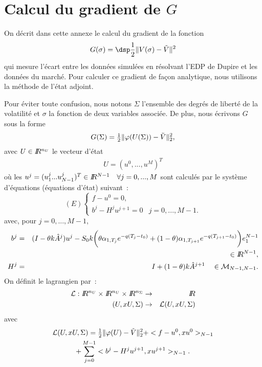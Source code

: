 \section{Calcul du gradient de $G$}
\label{ANN:GRADG}

On d\'ecrit dans cette annexe le calcul du gradient de la fonction 
$$
G(\sigma) = \dsp\frac{1}{2} \| V(\sigma) - \tilde{V} \|^2 
$$
qui mesure l'\'ecart entre les donn\'ees simul\'ees en r\'esolvant 
l'EDP de Dupire et les donn\'ees du march\'e. Pour calculer ce 
gradient de fa\c con analytique, nous utilisons la m\'ethode de 
l'\'etat adjoint.

Pour \'eviter toute confusion, nous notons $\Sigma$ l'ensemble 
des degr\'es de libert\'e de la volatilit\'e et $\sigma$ la 
fonction de deux variables associ\'ee. De plus, nous \'ecrivons 
$G$ sous la forme 
$$
G(\Sigma) = \mbox{$\frac{1}{2}$} \Arrowvert \varphi(U(\Sigma)) - 
\tilde{V} \Arrowvert_2^2,
$$
avec $U \in I\!\! R^{n_U}$ le vecteur d'\'etat 
\begin{eqnarray*}
U = (u^0,...,u^M)^T
\end{eqnarray*}
o\`u les $u^j = (u^j_1...u^j_{N-1})^T \in I\!\! R^{N-1} \quad 
\forall j=0,...,M$ sont calcul\'es par le syst\`eme d'\'equations 
(\'equations d'\'etat) suivant~:
\begin{equation*}
(E)
\begin{cases}
f-u^0 = 0, \\
b^j - H^ju^{j+1} = 0 & j=0,...,M-1. 
\end{cases}
\end{equation*}
avec, pour $j=0,...,M-1$,
\begin{eqnarray*}
b^j &=& (I-\theta k \hat{A}^j)u^j - S_0k
\biggl(\theta \alpha_{1,T_j}e^{-q(T_j-t_0)}+(1-\theta)
\alpha_{1,T_{j+1}}e^{-q(T_{j+1}-t_0)}\biggr)e_1^{N-1}\\
&& \in I\!\! R^{N-1},\\
H^j &=& I+(1-\theta)k\hat{A}^{j+1} \quad \in \mathcal{M}_{N-1,N-1}.
\end{eqnarray*}
On d\'efinit le lagrangien par~: 
\begin{eqnarray*}
\mathcal{L}:\cR^{n_U}\times\cR^{n_U}\times\cR^{n_{\Sigma}} & 
\rightarrow & \cR \\
(U,\bar{U},\Sigma) & \rightarrow & \mathcal{L}(U,\bar{U},\Sigma)
\end{eqnarray*}
avec 
\begin{multline}
\mathcal{L}(U,x{U},\Sigma) = \mbox{$\frac{1}{2}$} \Arrowvert \varphi(U) - 
\tilde{V} \Arrowvert_2^2 + <f-u^0,x{u}^0>_{N-1} \\
+ \sum_{j=0}^{M-1}<b^j-H^ju^{j+1},x{u}^{j+1}>_{N-1}.
\end{multline}

